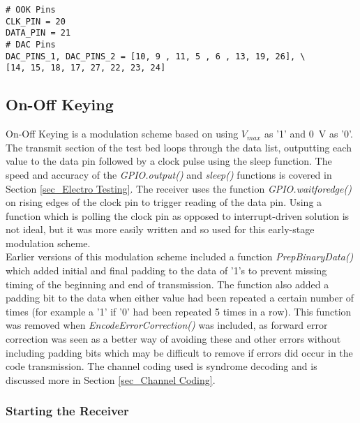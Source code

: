 \documentclass[../main.tex]{subfiles}
\begin{document}
\begin{lstlisting}[caption={Pins used for OOK and the DACs}, label={lst_Pins}]
# OOK Pins
CLK_PIN = 20
DATA_PIN = 21
# DAC Pins
DAC_PINS_1, DAC_PINS_2 = [10, 9 , 11, 5 , 6 , 13, 19, 26], \
[14, 15, 18, 17, 27, 22, 23, 24]
\end{lstlisting} 

\subsection{On-Off Keying} \label{sec_On-Off Keying}

On-Off Keying is a modulation scheme based on using $V_{max}$ as '1' and \SI{0}{\volt} as '0'.
The transmit section of the test bed loops through the data list, outputting each value to the data pin followed by a clock pulse using the sleep function.
The speed and accuracy of the \textit{GPIO.output()} and \textit{sleep()} functions is covered in Section \ref{sec_Electro Testing}.
The receiver uses the function \textit{GPIO.wait\textunderscore for\textunderscore edge()} on rising edges of the clock pin to trigger reading of the data pin.
Using a function which is polling the clock pin as opposed to interrupt-driven solution is not ideal, but it was more easily written and so used for this early-stage modulation scheme.\\

Earlier versions of this modulation scheme included a function \textit{Prep\textunderscore Binary\textunderscore Data()} which added initial and final padding to the data of '1's to prevent missing timing of the beginning and end of transmission.
The function also added a padding bit to the data when either value had been repeated a certain number of times (for example a '1' if '0' had been repeated 5 times in a row).
This function was removed when \textit{Encode\textunderscore Error\textunderscore Correction()} was included, as forward error correction was seen as a better way of avoiding these and other errors without including padding bits which may be difficult to remove if errors did occur in the code transmission.
The channel coding used is syndrome decoding and is discussed more in Section \ref{sec_Channel Coding}.\\


\subsubsection{Starting the Receiver} \label{sec_SSH}
\end{document}

